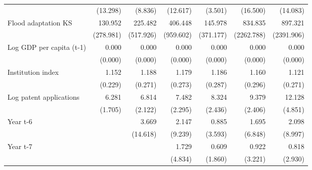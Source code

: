 \begin{table}[htbp]
\begin{tabular}{l*{6}{D{.}{.}{-1}}}
                    &    (13.298)         &     (8.836)         &    (12.617)         &     (3.501)         &    (16.500)         &    (14.083)         \\
\addlinespace
Flood adaptation KS &     130.952\sym{**} &     225.482\sym{**} &     406.448\sym{**} &     145.978\sym{*}  &     834.835\sym{**} &     897.321\sym{**} \\
                    &   (278.981)         &   (517.926)         &   (959.602)         &   (371.177)         &  (2262.788)         &  (2391.906)         \\
\addlinespace
Log GDP per capita (t-1)&       0.000\sym{**} &       0.000\sym{**} &       0.000\sym{***}&       0.000\sym{**} &       0.000\sym{***}&       0.000\sym{***}\\
                    &     (0.000)         &     (0.000)         &     (0.000)         &     (0.000)         &     (0.000)         &     (0.000)         \\
\addlinespace
Institution index   &       1.152         &       1.188         &       1.179         &       1.186         &       1.160         &       1.121         \\
                    &     (0.229)         &     (0.271)         &     (0.273)         &     (0.287)         &     (0.296)         &     (0.271)         \\
\addlinespace
Log patent applications&       6.281\sym{***}&       6.814\sym{***}&       7.482\sym{***}&       8.324\sym{***}&       9.379\sym{***}&      12.128\sym{***}\\
                    &     (1.705)         &     (2.122)         &     (2.295)         &     (2.436)         &     (2.406)         &     (4.851)         \\
\addlinespace
Year t-6            &                     &       3.669         &       2.147         &       0.885         &       1.695         &       2.098         \\
                    &                     &    (14.618)         &     (9.239)         &     (3.593)         &     (6.848)         &     (8.997)         \\
\addlinespace
Year t-7            &                     &                     &       1.729         &       0.609         &       0.922         &       0.818         \\
                    &                     &                     &     (4.834)         &     (1.860)         &     (3.221)         &     (2.930)         \\

\end{tabular}
\end{table}
